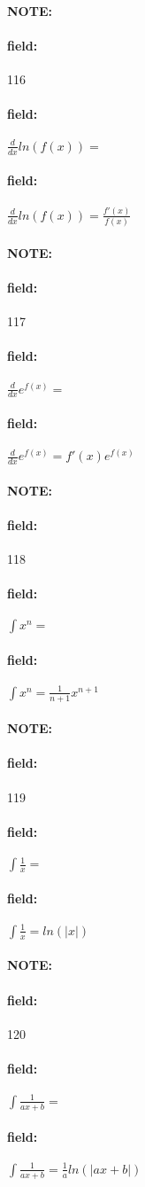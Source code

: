 \documentclass[12pt]{article}
\newenvironment{note}{\paragraph{NOTE:}}{}
\newenvironment{field}{\paragraph{field:}}{}
\begin{document}
\begin{note} \begin{field} \tiny 116 \end{field}
  \begin{field}
    $ \frac{d}{dx} ln(f(x)) = $
  \end{field}
  \begin{field}
    $ \frac{d}{dx} ln(f(x)) = \frac{f'(x)}{f(x)}$
  \end{field}
\end{note}

\begin{note} \begin{field} \tiny 117 \end{field}
  \begin{field}
    $\frac{d}{dx} e^{f(x)} = $
  \end{field}
  \begin{field}
    $\frac{d}{dx} e^{f(x)} = f'(x)e^{f(x)}$
  \end{field}
\end{note}

\begin{note} \begin{field} \tiny 118 \end{field}
  \begin{field}
    $\int x^n = $
  \end{field}
  \begin{field}
    $\int x^n = \frac{1}{n+1}x^{n+1}$
  \end{field}
\end{note}

\begin{note} \begin{field} \tiny 119 \end{field}
  \begin{field}
    $\int \frac{1}{x} = $
  \end{field}
  \begin{field}
    $\int \frac{1}{x} = ln(|x|)$
  \end{field}
\end{note}

\begin{note} \begin{field} \tiny 120 \end{field}
  \begin{field}
    $\int \frac{1}{ax + b} = $
  \end{field}
  \begin{field}
    $\int \frac{1}{ax + b} = \frac{1}{a}ln(|ax + b|)$
  \end{field}
\end{note}
\end{document}
